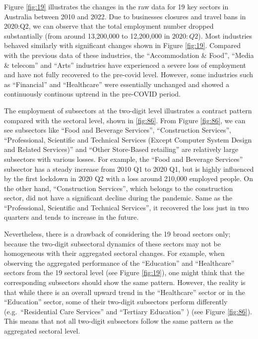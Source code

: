 \documentclass{monashthesis}
\begin{document}
Figure \ref{fig:19} illustrates the changes in the raw data for 19 key sectors in Australia between 2010 and 2022. Due to businesses closures and travel bans in 2020:Q2, we can observe that the total employment number dropped substantially (from around 13,200,000 to 12,200,000 in \(2020:Q2\)). Most industries behaved similarly with significant changes shown in Figure \ref{fig:19}. Compared with the previous data of these industries, the ``Accommodation \& Food'', ``Media \& telecom'' and ``Arts'' industries have experienced a severe loss of employment and have not fully recovered to the pre-covid level. However, some industries such as ``Financial'' and ``Healthcare'' were essentially unchanged and showed a continuously continous uptrend in the pre-COVID period.

The employment of subsectors at the two-digit level illustrates a contract pattern compared with the sectoral level, shown in \ref{fig:86}. From Figure \ref{fig:86}, we can see subsectors like ``Food and Beverage Services'', ``Construction Services'', ``Professional, Scientific and Technical Services (Except Computer System Design and Related Services)'' and ``Other Store-Based retailing'' are relatively large subsectors with various losses. For example, the ``Food and Beverage Services'' subsector has a steady increase from 2010 Q1 to 2020 Q1, but is highly influenced by the first lockdown in 2020 Q2 with a loss around 210,000 employed people. On the other hand, ``Construction Services'', which belongs to the construction sector, did not have a significant decline during the pandemic. Same as the ``Professional, Scientific and Technical Services'', it recovered the loss just in two quarters and tends to increase in the future.

Nevertheless, there is a drawback of considering the 19 broad sectors only; because the two-digit subsectoral dynamics of these sectors may not be homogeneous with their aggregated sectoral changes. For example, when observing the aggregated performance of the ``Education'' and ``Healthcare'' sectors from the 19 sectoral level (see Figure \ref{fig:19}), one might think that the corresponding subsectors should show the same pattern. However, the reality is that while there is an overall upward trend in the ``Healthcare'' sector or in the ``Education'' sector, some of their two-digit subsectors perform differently (e.g.~``Residential Care Services'' and ``Tertiary Education'' ) (see Figure \ref{fig:86}). This means that not all two-digit subsectors follow the same pattern as the aggregated sectoral level.
\end{document}
